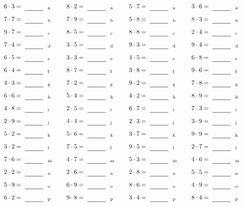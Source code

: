 \documentclass
[
  draft    = true,
  fontsize = 11pt,
  parskip  = half-
]
{scrartcl}
\begin{document}
\par\vfill\par
\begin{align*}
    \pline{6\cdot3}&=\rline{a}
  & \pline{8\cdot2}&=\rline{a}
  & \pline{5\cdot7}&=\rline{a}
  & \pline{3\cdot6}&=\rline{a} \\[1ex]
    \pline{7\cdot7}&=\rline{b}
  & \pline{7\cdot9}&=\rline{b}
  & \pline{5\cdot8}&=\rline{b}
  & \pline{8\cdot3}&=\rline{b} \\[1ex]
    \pline{9\cdot7}&=\rline{c}
  & \pline{8\cdot5}&=\rline{c}
  & \pline{8\cdot8}&=\rline{c}
  & \pline{2\cdot4}&=\rline{c} \\[1ex]
    \pline{7\cdot4}&=\rline{d}
  & \pline{3\cdot5}&=\rline{d}
  & \pline{9\cdot3}&=\rline{d}
  & \pline{9\cdot4}&=\rline{d} \\[1ex]
    \pline{6\cdot5}&=\rline{e}
  & \pline{3\cdot3}&=\rline{e}
  & \pline{4\cdot5}&=\rline{e}
  & \pline{6\cdot8}&=\rline{e} \\[1ex]
    \pline{6\cdot4}&=\rline{f}
  & \pline{8\cdot7}&=\rline{f}
  & \pline{3\cdot8}&=\rline{f}
  & \pline{9\cdot6}&=\rline{f} \\[1ex]
    \pline{4\cdot3}&=\rline{g}
  & \pline{7\cdot2}&=\rline{g}
  & \pline{9\cdot2}&=\rline{g}
  & \pline{7\cdot8}&=\rline{g} \\[1ex]
    \pline{6\cdot6}&=\rline{h}
  & \pline{5\cdot4}&=\rline{h}
  & \pline{4\cdot2}&=\rline{h}
  & \pline{8\cdot9}&=\rline{h} \\[1ex]
    \pline{4\cdot8}&=\rline{i}
  & \pline{2\cdot5}&=\rline{i}
  & \pline{6\cdot7}&=\rline{i}
  & \pline{7\cdot3}&=\rline{i} \\[1ex]
    \pline{2\cdot9}&=\rline{j}
  & \pline{4\cdot4}&=\rline{j}
  & \pline{2\cdot3}&=\rline{j}
  & \pline{3\cdot9}&=\rline{j} \\[1ex]
    \pline{5\cdot2}&=\rline{k}
  & \pline{5\cdot6}&=\rline{k}
  & \pline{3\cdot7}&=\rline{k}
  & \pline{9\cdot9}&=\rline{k} \\[1ex]
    \pline{3\cdot2}&=\rline{l}
  & \pline{7\cdot5}&=\rline{l}
  & \pline{9\cdot5}&=\rline{l}
  & \pline{2\cdot7}&=\rline{l} \\[1ex]
    \pline{7\cdot6}&=\rline{m}
  & \pline{4\cdot7}&=\rline{m}
  & \pline{5\cdot3}&=\rline{m}
  & \pline{4\cdot6}&=\rline{m} \\[1ex]
    \pline{2\cdot2}&=\rline{n}
  & \pline{2\cdot6}&=\rline{n}
  & \pline{2\cdot8}&=\rline{n}
  & \pline{5\cdot5}&=\rline{n} \\[1ex]
    \pline{5\cdot9}&=\rline{o}
  & \pline{6\cdot9}&=\rline{o}
  & \pline{8\cdot6}&=\rline{o}
  & \pline{4\cdot9}&=\rline{o} \\[1ex]
    \pline{6\cdot2}&=\rline{p}
  & \pline{9\cdot8}&=\rline{p}
  & \pline{3\cdot4}&=\rline{p}
  & \pline{8\cdot4}&=\rline{p}
\end{align*}
\end{document}
